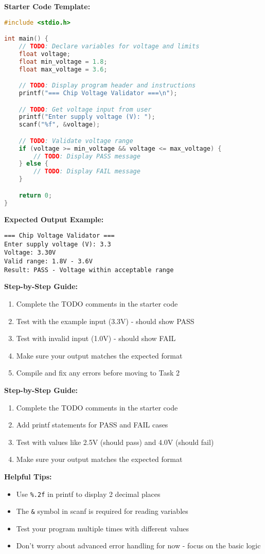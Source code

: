 \documentclass[11pt,a4paper]{article}
\begin{document}
\textbf{Starter Code Template:}
\begin{lstlisting}[language=C]
#include <stdio.h>

int main() {
    // TODO: Declare variables for voltage and limits
    float voltage;
    float min_voltage = 1.8;
    float max_voltage = 3.6;

    // TODO: Display program header and instructions
    printf("=== Chip Voltage Validator ===\n");

    // TODO: Get voltage input from user
    printf("Enter supply voltage (V): ");
    scanf("%f", &voltage);

    // TODO: Validate voltage range
    if (voltage >= min_voltage && voltage <= max_voltage) {
        // TODO: Display PASS message
    } else {
        // TODO: Display FAIL message
    }

    return 0;
}
\end{lstlisting}

\textbf{Expected Output Example:}
\begin{verbatim}
=== Chip Voltage Validator ===
Enter supply voltage (V): 3.3
Voltage: 3.30V
Valid range: 1.8V - 3.6V
Result: PASS - Voltage within acceptable range
\end{verbatim}

\textbf{Step-by-Step Guide:}
\begin{enumerate}
    \item Complete the TODO comments in the starter code
    \item Test with the example input (3.3V) - should show PASS
    \item Test with invalid input (1.0V) - should show FAIL
    \item Make sure your output matches the expected format
    \item Compile and fix any errors before moving to Task 2
\end{enumerate}

\textbf{Step-by-Step Guide:}
\begin{enumerate}
    \item Complete the TODO comments in the starter code
    \item Add printf statements for PASS and FAIL cases
    \item Test with values like 2.5V (should pass) and 4.0V (should fail)
    \item Make sure your output matches the expected format
\end{enumerate}

\textbf{Helpful Tips:}
\begin{itemize}
    \item Use \texttt{\%.2f} in printf to display 2 decimal places
    \item The \texttt{\&} symbol in scanf is required for reading variables
    \item Test your program multiple times with different values
    \item Don't worry about advanced error handling for now - focus on the basic logic
\end{itemize}
\end{document}
